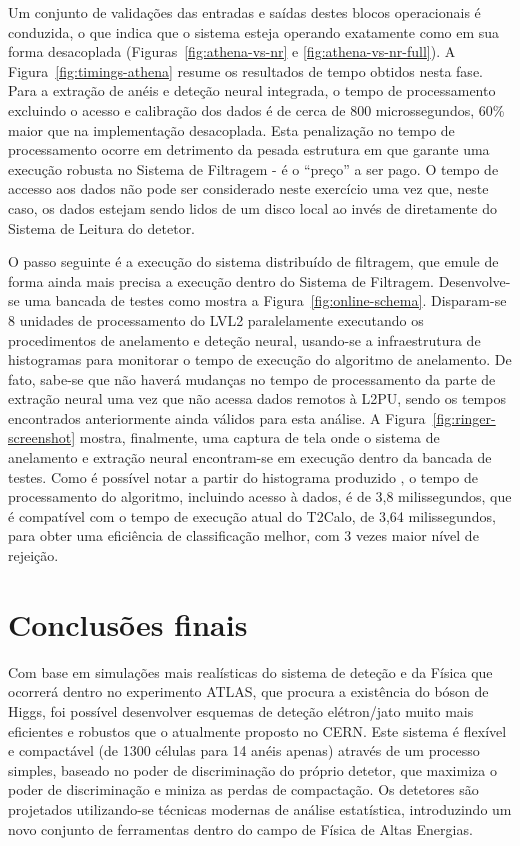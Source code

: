 Um conjunto de validações das entradas e saídas destes blocos operacionais é
conduzida, o que indica que o sistema esteja operando exatamente como em sua
forma desacoplada (Figuras~\ref{fig:athena-vs-nr} e
\ref{fig:athena-vs-nr-full}). A Figura~\ref{fig:timings-athena} resume os
resultados de tempo obtidos nesta fase. Para a extração de anéis e deteção
neural integrada, o tempo de processamento excluindo o acesso e calibração dos
dados é de cerca de 800 microssegundos, 60\% maior que na implementação
desacoplada. Esta penalização no tempo de processamento ocorre em detrimento
da pesada estrutura em  que garante uma execução robusta no
Sistema de Filtragem - é o ``preço'' a ser pago. O tempo de accesso aos dados
não pode ser considerado neste exercício uma vez que, neste caso, os dados
estejam sendo lidos de um disco local ao invés de diretamente do Sistema de
Leitura do detetor.

O passo seguinte é a execução do sistema distribuído de filtragem, que emule
de forma ainda mais precisa a execução dentro do Sistema de
Filtragem. Desenvolve-se uma bancada de testes como mostra a
Figura~\ref{fig:online-schema}. Disparam-se 8 unidades de processamento do
LVL2 paralelamente executando os procedimentos de anelamento e deteção neural,
usando-se a infraestrutura de histogramas  para monitorar o tempo
de execução do algoritmo de anelamento. De fato, sabe-se que não haverá
mudanças no tempo de processamento da parte de extração neural uma vez que não
acessa dados remotos à L2PU, sendo os tempos encontrados anteriormente ainda
válidos para esta análise. A Figura~\ref{fig:ringer-screenshot} mostra,
finalmente, uma captura de tela onde o sistema de anelamento e extração neural
encontram-se em execução dentro da bancada de testes. Como é possível notar a
partir do histograma produzido , o tempo de processamento do
algoritmo, incluindo acesso à dados, é de 3,8 milissegundos, que é compatível
com o tempo de execução atual do T2Calo, de 3,64 milissegundos, para obter uma
eficiência de classificação melhor, com 3 vezes maior nível de rejeição.

\section{Conclusões finais}

Com base em simulações mais realísticas do sistema de deteção e da Física que
ocorrerá dentro no experimento ATLAS, que procura a existência do bóson de
Higgs, foi possível desenvolver esquemas de deteção elétron/jato muito mais
eficientes e robustos que o atualmente proposto no CERN. Este sistema é
flexível e compactável (de 1300 células para 14 anéis apenas) através de um
processo simples, baseado no poder de discriminação do próprio detetor, que
maximiza o poder de discriminação e miniza as perdas de compactação. Os
detetores são projetados utilizando-se técnicas modernas de análise
estatística, introduzindo um novo conjunto de ferramentas dentro do campo de
Física de Altas Energias.

